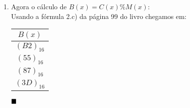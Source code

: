 \documentclass[12pt]{article}
\begin{document}
\begin{enumerate}
				Em Hexadecimal temos:
				$C(x) = (34)x^6 + (7E)x^5 + (CE)x^5 + (FB)x^4 + (36)x^4 + (AA)x^4 + (5B)x^3 + (6F)x^3 + (EF)x^3 + (69)x^3 +
				(4A)x^2 + (60)x^2 + (4B)x^2 + (40)x + (77)x + (5A)$
				
				\item
					Agora o cálculo de $B(x) = C(x) \% M(x)$:\\
					Usando a fórmula 2.c) da página 99 do livro chegamos em:\\
					\begin{table}[h]
						\centering
						\vspace{0.5cm}
						\begin{tabular}{c}
						$B(x)$\\
						\hline                               
							$(B2)_{16}$\\
							$(55)_{16}$\\
							$(87)_{16}$\\
							$(3D)_{16}$\\
						\end{tabular}
					\end{table}
					
				$\hfill\blacksquare$	
					
		\end{enumerate}			
\end{document}

